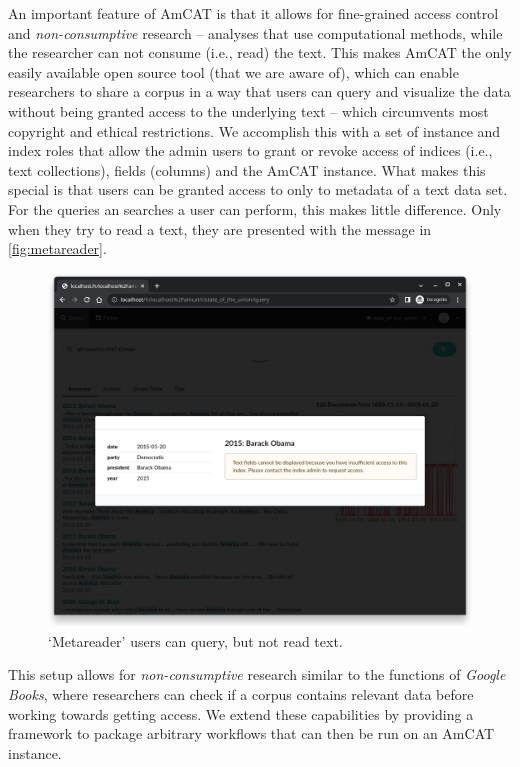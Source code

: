 \documentclass[
  a4paper,
  DIV=11,
  numbers=noendperiod]{scrartcl}
\begin{document}
An important feature of AmCAT is that it allows for fine-grained access
control and \emph{non-consumptive} research -- analyses that use
computational methods, while the researcher can not consume (i.e., read)
the text. This makes AmCAT the only easily available open source tool
(that we are aware of), which can enable researchers to share a corpus
in a way that users can query and visualize the data without being
granted access to the underlying text -- which circumvents most
copyright and ethical restrictions. We accomplish this with a set of
instance and index roles that allow the admin users to grant or revoke
access of indices (i.e., text collections), fields (columns) and the
AmCAT instance. What makes this special is that users can be granted
access to only to metadata of a text data set. For the queries an
searches a user can perform, this makes little difference. Only when
they try to read a text, they are presented with the message in
\autoref{fig:metareader}.

\begin{figure}

{\centering \includegraphics{media/sotu_text_guest.png}

}

\caption{`Metareader' users can query, but not read
text.\label{fig:metareader}}

\end{figure}

This setup allows for \emph{non-consumptive} research similar to the
functions of \emph{Google Books}, where researchers can check if a
corpus contains relevant data before working towards getting access. We
extend these capabilities by providing a framework to package arbitrary
workflows that can then be run on an AmCAT instance.
\end{document}
